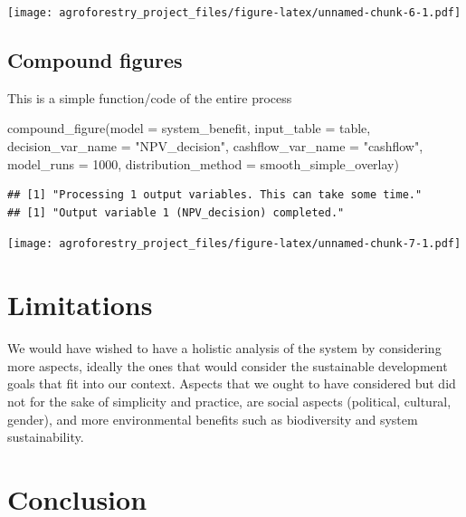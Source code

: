 \documentclass[
]{article}
\newenvironment{Shaded}{\begin{snugshade}}{\end{snugshade}}
\newcommand{\AttributeTok}[1]{\textcolor[rgb]{0.77,0.63,0.00}{#1}}
\newcommand{\DecValTok}[1]{\textcolor[rgb]{0.00,0.00,0.81}{#1}}
\newcommand{\FunctionTok}[1]{\textcolor[rgb]{0.00,0.00,0.00}{#1}}
\newcommand{\NormalTok}[1]{#1}
\newcommand{\StringTok}[1]{\textcolor[rgb]{0.31,0.60,0.02}{#1}}
\begin{document}
\texttt{[image: agroforestry\_project\_files/figure-latex/unnamed-chunk-6-1.pdf]}

\hypertarget{compound-figures}{%
\subsection{\texorpdfstring{\textbf{Compound figures}}{Compound figures}}\label{compound-figures}}

This is a simple function/code of the entire process

\begin{Shaded}
\begin{Highlighting}[]
\FunctionTok{compound\_figure}\NormalTok{(}\AttributeTok{model =}\NormalTok{ system\_benefit, }
\AttributeTok{input\_table =}\NormalTok{ table, }
\AttributeTok{decision\_var\_name =} \StringTok{"NPV\_decision"}\NormalTok{,}
\AttributeTok{cashflow\_var\_name =} \StringTok{"cashflow"}\NormalTok{,}
\AttributeTok{model\_runs =} \DecValTok{1000}\NormalTok{,}
\AttributeTok{distribution\_method =} \StringTok{\textquotesingle{}smooth\_simple\_overlay\textquotesingle{}}\NormalTok{)}
\end{Highlighting}
\end{Shaded}

\begin{verbatim}
## [1] "Processing 1 output variables. This can take some time."
## [1] "Output variable 1 (NPV_decision) completed."
\end{verbatim}

\texttt{[image: agroforestry\_project\_files/figure-latex/unnamed-chunk-7-1.pdf]}

\hypertarget{limitations}{%
\section{\texorpdfstring{\textbf{Limitations}}{Limitations}}\label{limitations}}

We would have wished to have a holistic analysis of the system by considering more aspects, ideally the ones that would consider the sustainable development goals that fit into our context. Aspects that we ought to have considered but did not for the sake of simplicity and practice, are social aspects (political, cultural, gender), and more environmental benefits such as biodiversity and system sustainability.

\hypertarget{conclusion}{%
\section{\texorpdfstring{\textbf{Conclusion}}{Conclusion}}\label{conclusion}}
\end{document}
